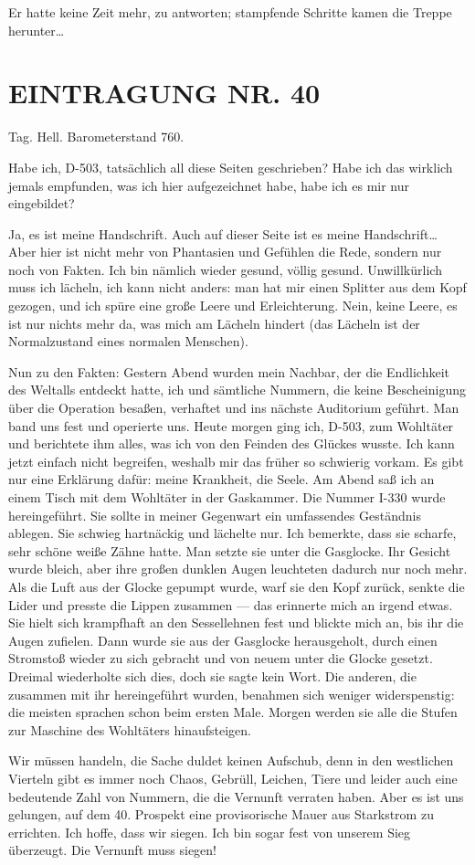 Er hatte keine Zeit mehr, zu antworten; stampfende Schritte kamen
die Treppe herunter\ldots{}

\section{EINTRAGUNG NR. 40}

Tag. Hell. Barometerstand 760.

Habe ich, D-503, tatsächlich all diese Seiten geschrieben? Habe ich
das wirklich jemals empfunden, was ich hier aufgezeichnet habe,
habe ich es mir nur eingebildet?

Ja, es ist meine Handschrift. Auch auf dieser Seite ist es meine
Handschrift\ldots{} Aber hier ist nicht mehr von Phantasien und Gefühlen
die Rede, sondern nur noch von Fakten. Ich bin nämlich wieder
gesund, völlig gesund. Unwillkürlich muss ich lächeln, ich kann
nicht anders: man hat mir einen Splitter aus dem Kopf gezogen, und
ich spüre eine große Leere und Erleichterung. Nein, keine Leere, es
ist nur nichts mehr da, was mich am Lächeln hindert (das Lächeln
ist der Normalzustand eines normalen Menschen).

Nun zu den Fakten: Gestern Abend wurden mein Nachbar, der die
Endlichkeit des Weltalls entdeckt hatte, ich und sämtliche Nummern,
die keine Bescheinigung über die Operation besaßen, verhaftet und
ins nächste Auditorium geführt. Man band uns fest und operierte
uns. Heute morgen ging ich, D-503, zum Wohltäter und berichtete ihm
alles, was ich von den Feinden des Glückes wusste. Ich kann jetzt
einfach nicht begreifen, weshalb mir das früher so schwierig
vorkam. Es gibt nur eine Erklärung dafür: meine Krankheit, die
Seele. Am Abend saß ich an einem Tisch mit dem Wohltäter in der
Gaskammer. Die Nummer I-330 wurde hereingeführt. Sie sollte in
meiner Gegenwart ein umfassendes Geständnis ablegen. Sie schwieg
hartnäckig und lächelte nur. Ich bemerkte, dass sie scharfe, sehr
schöne weiße Zähne hatte. Man setzte sie unter die Gasglocke. Ihr
Gesicht wurde bleich, aber ihre großen dunklen Augen leuchteten
dadurch nur noch mehr. Als die Luft aus der Glocke gepumpt wurde,
warf sie den Kopf zurück, senkte die Lider und presste die Lippen
zusammen — das erinnerte mich an irgend etwas. Sie hielt sich
krampfhaft an den Sessellehnen fest und blickte mich an, bis ihr
die Augen zufielen. Dann wurde sie aus der Gasglocke herausgeholt,
durch einen Stromstoß wieder zu sich gebracht und von neuem unter
die Glocke gesetzt. Dreimal wiederholte sich dies, doch sie sagte
kein Wort. Die anderen, die zusammen mit ihr hereingeführt wurden,
benahmen sich weniger widerspenstig: die meisten sprachen schon
beim ersten Male. Morgen werden sie alle die Stufen zur Maschine
des Wohltäters hinaufsteigen.

Wir müssen handeln, die Sache duldet keinen Aufschub, denn in den
westlichen Vierteln gibt es immer noch Chaos, Gebrüll, Leichen,
Tiere und leider auch eine bedeutende Zahl von Nummern, die die
Vernunft verraten haben. Aber es ist uns gelungen, auf dem 40.
Prospekt eine provisorische Mauer aus Starkstrom zu errichten. Ich
hoffe, dass wir siegen. Ich bin sogar fest von unserem Sieg
überzeugt. Die Vernunft muss siegen!



